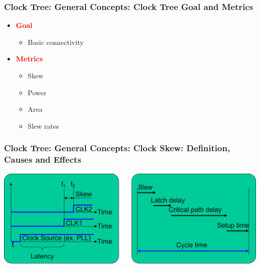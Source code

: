 \documentclass[compress]{beamer}
\begin{document}
\begin{frame}
	\frametitle{Clock Tree: General Concepts: Clock Tree Goal and Metrics }
\begin{itemize}
	\item \textcolor{red}{\textbf{Goal}}
	\begin{itemize}
		\item Basic connectivity
	\end{itemize}
	
	\item \textcolor{red}{\textbf{Metrics}}
	\begin{itemize}
		\item Skew
		\item Power
		\item Area
		\item Slew rates
		
	\end{itemize}
	
\end{itemize}
\end{frame}
\begin{frame}
	\frametitle{Clock Tree: General Concepts: Clock Skew: Definition, Causes and Effects}
	\begin{center}
		\includegraphics[width=\textwidth]{skew}
	\end{center}
\end{frame}
\end{document}
